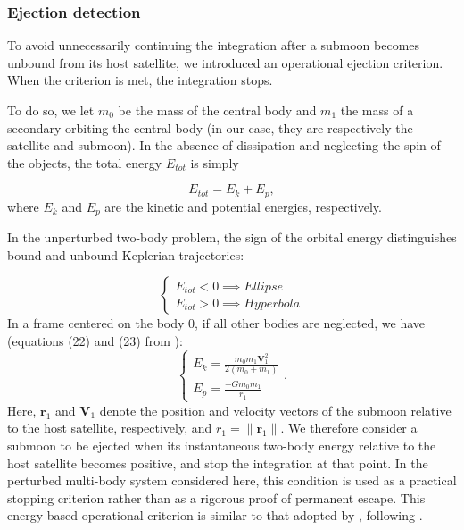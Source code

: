 \documentclass{aa}
\begin{document}
\subsubsection{Ejection detection}\label{subsect:eject}

To avoid unnecessarily continuing the integration after a submoon becomes unbound from its host satellite, we introduced an operational ejection criterion. When the criterion is met, the integration stops.

To do so, we let $m_0$ be the mass of the central body and $m_1$ the mass of a secondary orbiting the central body (in our case, they are respectively the satellite and submoon). 
In the absence of dissipation and neglecting the spin of the objects, the total energy $E_{tot}$ is simply

\begin{equation}
    E_{tot} = E_{k}+E_{p}
,\end{equation}where $E_k$ and $E_p$ are the kinetic and potential energies, respectively.

In the unperturbed two-body problem, the sign of the orbital energy distinguishes bound and unbound Keplerian trajectories:

\begin{equation}
    \label{Eq: ec_ep}
    \left\{
        \begin{array}{ll}
            E_{tot}  < 0 \implies Ellipse\\
            E_{tot} >0 \implies Hyperbola
        \end{array}
    \right.
\end{equation}In a frame centered on the body $0$, if all other bodies are neglected, we have (equations (22) and (23) from \cite{Lainey2004}):
\begin{equation}
\label{Eq:Ec_Ep_inertial}
    \left\{
        \begin{array}{ll}
          \displaystyle  E_k  = \frac{m_0m_1 \mathbf{V}_1^2}{2(m_0+m_1)}\\
          \displaystyle  E_p  = \frac{-Gm_0m_1}{r_1} 
        \end{array}
    \right.
.\end{equation}Here, $\mathbf{r}_1$ and $\mathbf{V}_1$ denote the position and velocity vectors of the submoon relative to the host satellite, respectively, and $r_1=\lVert\mathbf{r}_1\rVert$. We therefore consider a submoon to be ejected when its instantaneous two-body energy relative to the host satellite becomes positive, and stop the integration at that point. In the perturbed multi-body system considered here, this condition is used as a practical stopping criterion rather than as a rigorous proof of permanent escape. This energy-based operational criterion is similar to that adopted by \cite{Domingos_2006}, following \cite{Neto_Winter_Melo_2004}.  
\end{document}
